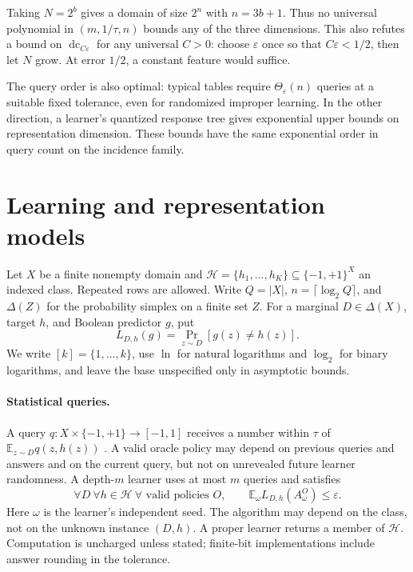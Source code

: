 \documentclass[11pt,letterpaper,pmlr,twoside]{jmlr}
\newcommand{\Hc}{\mathcal H}
\newcommand{\E}{\mathbb E}
\newcommand{\eps}{\varepsilon}
\newcommand{\dc}{\operatorname{dc}}
\newcommand{\ceil}[1]{\lceil #1\rceil}
\begin{document}
Taking $N=2^b$ gives a domain of size $2^n$ with $n=3b+1$. Thus no universal polynomial in $(m,1/\tau,n)$ bounds any of the three dimensions. This also refutes a bound on $\dc_{C\eps}$ for any universal $C>0$: choose $\eps$ once so that $C\eps<1/2$, then let $N$ grow. At error $1/2$, a constant feature would suffice.

The query order is also optimal: typical tables require $\Theta_\eps(n)$ queries at a suitable fixed tolerance, even for randomized improper learning. In the other direction, a learner's quantized response tree gives exponential upper bounds on representation dimension. These bounds have the same exponential order in query count on the incidence family.

\section{Learning and representation models}\label{sec:definitions}
Let $X$ be a finite nonempty domain and $\Hc=\{h_1,\ldots,h_K\}\subseteq\{-1,+1\}^{X}$ an indexed class. Repeated rows are allowed. Write $Q=|X|$, $n=\ceil{\log_2 Q}$, and $\Delta(Z)$ for the probability simplex on a finite set $Z$. For a marginal $D\in\Delta(X)$, target $h$, and Boolean predictor $g$, put
\[
 L_{D,h}(g)=\Pr_{z\sim D}[g(z)\ne h(z)].
\]
We write $[k]=\{1,\ldots,k\}$, use $\ln$ for natural logarithms and $\log_2$ for binary logarithms, and leave the base unspecified only in asymptotic bounds.

\paragraph{Statistical queries.}
A query $q:X\times\{-1,+1\}\to[-1,1]$ receives a number within $\tau$ of $\E_{z\sim D}q(z,h(z))$ \citep{Kearns98}. A valid oracle policy may depend on previous queries and answers and on the current query, but not on unrevealed future learner randomness. A depth-$m$ learner uses at most $m$ queries and satisfies
\begin{equation}
 \forall D\ \forall h\in\Hc\ \forall\text{ valid policies }O,
 \qquad \E_\omega L_{D,h}(A^O_\omega)\le\eps.
 \label{eq:learnmodel}
\end{equation}
Here $\omega$ is the learner's independent seed. The algorithm may depend on the class, not on the unknown instance $(D,h)$. A proper learner returns a member of $\Hc$. Computation is uncharged unless stated; finite-bit implementations include answer rounding in the tolerance.
\end{document}
